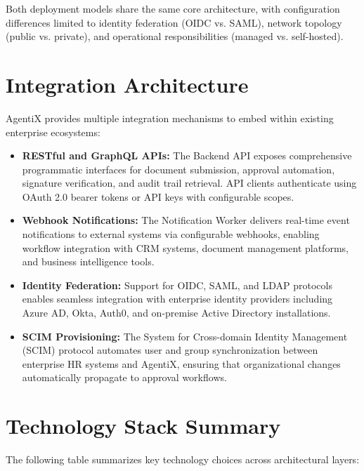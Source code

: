 \documentclass[12pt,oneside,openright,a4paper]{cpe-english-project}
\begin{document}
Both deployment models share the same core architecture, with configuration differences limited to identity federation (OIDC vs. SAML), network topology (public vs. private), and operational responsibilities (managed vs. self-hosted).

\vspace{1em}

\section{Integration Architecture}

AgentiX provides multiple integration mechanisms to embed within existing enterprise ecosystems:

\begin{itemize}
\item \textbf{RESTful and GraphQL APIs:} The Backend API exposes comprehensive programmatic interfaces for document submission, approval automation, signature verification, and audit trail retrieval. API clients authenticate using OAuth 2.0 bearer tokens or API keys with configurable scopes.

\item \textbf{Webhook Notifications:} The Notification Worker delivers real-time event notifications to external systems via configurable webhooks, enabling workflow integration with CRM systems, document management platforms, and business intelligence tools.

\item \textbf{Identity Federation:} Support for OIDC, SAML, and LDAP protocols enables seamless integration with enterprise identity providers including Azure AD, Okta, Auth0, and on-premise Active Directory installations.

\item \textbf{SCIM Provisioning:} The System for Cross-domain Identity Management (SCIM) protocol automates user and group synchronization between enterprise HR systems and AgentiX, ensuring that organizational changes automatically propagate to approval workflows.
\end{itemize}

\vspace{1em}

\section{Technology Stack Summary}

The following table summarizes key technology choices across architectural layers:
\end{document}
